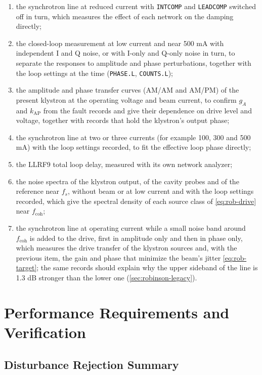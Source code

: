 \begin{enumerate}
\item the synchrotron line at reduced current with \texttt{INTCOMP} and \texttt{LEADCOMP} switched off in turn, which measures the effect of each network on the damping directly;
\item the closed-loop measurement at low current and near 500 mA with independent I and Q noise, or with I-only and Q-only noise in turn, to separate the responses to amplitude and phase perturbations, together with the loop settings at the time (\texttt{PHASE.L}, \texttt{COUNTS.L});
\item the amplitude and phase transfer curves (AM/AM and AM/PM) of the present klystron at the operating voltage and beam current, to confirm \(g_A\) and \(k_\text{AP}\) from the fault records and give their dependence on drive level and voltage, together with records that hold the klystron's output phase;
\item the synchrotron line at two or three currents (for example 100, 300 and 500 mA) with the loop settings recorded, to fit the effective loop phase directly;
\item the LLRF9 total loop delay, measured with its own network analyzer;
\item the noise spectra of the klystron output, of the cavity probes and of the reference near \(f_s\), without beam or at low current and with the loop settings recorded, which give the spectral density of each source class of \cref{eq:rob-drive} near \(f_\text{coh}\);
\item the synchrotron line at operating current while a small noise band around \(f_\text{coh}\) is added to the drive, first in amplitude only and then in phase only, which measures the drive transfer of the klystron sources and, with the previous item, the gain and phase that minimize the beam's jitter \eqref{eq:rob-target}; the same records should explain why the upper sideband of the line is 1.3 dB stronger than the lower one (\cref{sec:robinson-legacy}).
\end{enumerate}

\section{Performance Requirements and Verification}\label{sec:performance}


\subsection{Disturbance Rejection Summary}\label{sec:perf-rejection}


